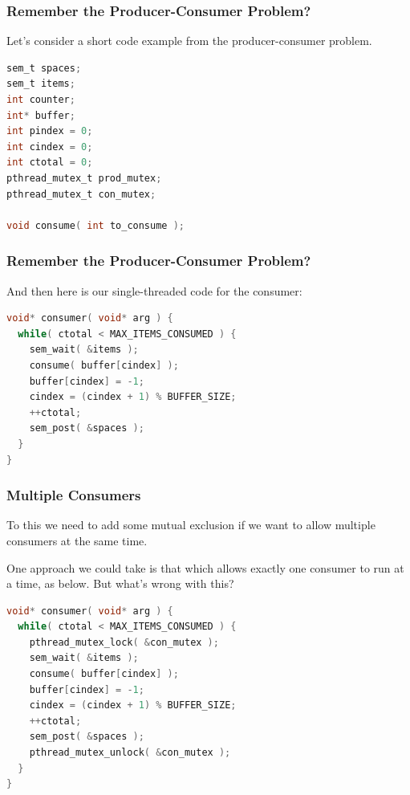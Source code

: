 \begin{frame}[fragile]
\frametitle{Remember the Producer-Consumer Problem?}

Let's consider a short code example from the producer-consumer problem.

\begin{lstlisting}[language=C]
sem_t spaces;
sem_t items;
int counter;
int* buffer;
int pindex = 0;
int cindex = 0;
int ctotal = 0;
pthread_mutex_t prod_mutex;
pthread_mutex_t con_mutex;

void consume( int to_consume );

\end{lstlisting}


\end{frame}


\begin{frame}[fragile]
\frametitle{Remember the Producer-Consumer Problem?}

And then here is our single-threaded code for the consumer:

\begin{lstlisting}[language=C]
void* consumer( void* arg ) { 
  while( ctotal < MAX_ITEMS_CONSUMED ) {
    sem_wait( &items );
    consume( buffer[cindex] );
    buffer[cindex] = -1;
    cindex = (cindex + 1) % BUFFER_SIZE;
    ++ctotal;
    sem_post( &spaces );
  }
}
\end{lstlisting}


\end{frame}


\begin{frame}[fragile]
\frametitle{Multiple Consumers}
To this we need to add some mutual exclusion if we want to allow multiple consumers at the same time. 

One approach we could take is that which allows exactly one consumer to run at a time, as below. But what's wrong with this?

\begin{lstlisting}[language=C]
void* consumer( void* arg ) { 
  while( ctotal < MAX_ITEMS_CONSUMED ) {
    pthread_mutex_lock( &con_mutex );
    sem_wait( &items );
    consume( buffer[cindex] );
    buffer[cindex] = -1;
    cindex = (cindex + 1) % BUFFER_SIZE;
    ++ctotal;
    sem_post( &spaces );
    pthread_mutex_unlock( &con_mutex );
  }
}
\end{lstlisting}


\end{frame}


